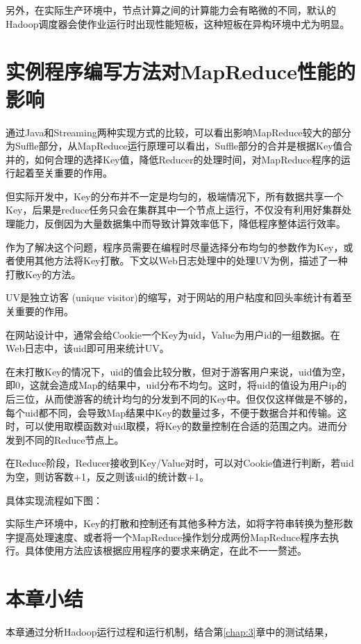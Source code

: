另外，在实际生产环境中，节点计算之间的计算能力会有略微的不同，默认的Hadoop调度器会使作业运行时出现性能短板，这种短板在异构环境中尤为明显。

\section{实例程序编写方法对MapReduce性能的影响}
通过Java和Streaming两种实现方式的比较，可以看出影响MapReduce较大的部分为Suffle部分，从MapReduce运行原理可以看出，Suffle部分的合并是根据Key值合并的，如何合理的选择Key值，降低Reducer的处理时间，对MapReduce程序的运行起着至关重要的作用。

但实际开发中，Key的分布并不一定是均匀的，极端情况下，所有数据共享一个Key，后果是reduce任务只会在集群其中一个节点上运行，不仅没有利用好集群处理能力，反倒因为大量数据集中而导致计算效率低下，降低程序整体运行效率。

作为了解决这个问题，程序员需要在编程时尽量选择分布均匀的参数作为Key，或者使用其他方法将Key打散。下文以Web日志处理中的处理UV为例，描述了一种打散Key的方法。

UV是独立访客 (unique visitor)的缩写，对于网站的用户粘度和回头率统计有着至关重要的作用。

在网站设计中，通常会给Cookie一个Key为uid，Value为用户id的一组数据。在Web日志中，该uid即可用来统计UV。

在未打散Key的情况下，uid的值会比较分散，但对于游客用户来说，uid值为空，即0，这就会造成Map的结果中，uid分布不均匀。这时，将uid的值设为用户ip的后三位，从而使游客的统计均匀的分发到不同的Key中。但仅仅这样做是不够的，每个uid都不同，会导致Map结果中Key的数量过多，不便于数据合并和传输。这时，可以使用取模函数对uid取模，将Key的数量控制在合适的范围之内。进而分发到不同的Reduce节点上。

在Reduce阶段，Reducer接收到Key/Value对时，可以对Cookie值进行判断，若uid为空，则访客数+1，反之则该uid的统计数+1。

具体实现流程如下图：

实际生产环境中，Key的打散和控制还有其他多种方法，如将字符串转换为整形数字提高处理速度、或者将一个MapReduce操作划分成两份MapReduce程序去执行。具体使用方法应该根据应用程序的要求来确定，在此不一一赘述。

\section{本章小结}
本章通过分析Hadoop运行过程和运行机制，结合第\ref{chap:3}章中的测试结果，
